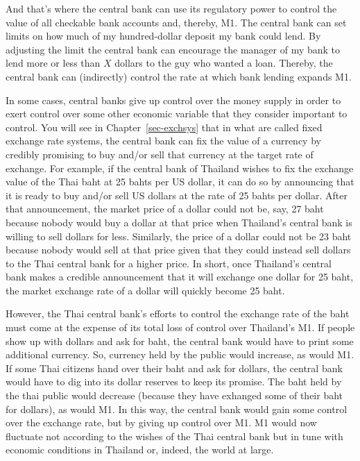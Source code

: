 \documentclass[
  letterpaper,
]{book}
\theoremstyle{plain}
\theoremstyle{remark}
\begin{document}
And that's where the central bank can use its regulatory power to
control the value of all checkable bank accounts and, thereby, M1. The
central bank can set limits on how much of my hundred-dollar deposit my
bank could lend. By adjusting the limit the central bank can encourage
the manager of my bank to lend more or less than \(X\) dollars to the
guy who wanted a loan. Thereby, the central bank can (indirectly)
control the rate at which bank lending expands M1.

In some cases, central banks give up control over the money supply in
order to exert control over some other economic variable that they
consider important to control. You will see in Chapter~\ref{sec-exchsys}
that in what are called fixed exchange rate systems, the central bank
can fix the value of a currency by credibly promising to buy and/or sell
that currency at the target rate of exchange. For example, if the
central bank of Thailand wishes to fix the exchange value of the Thai
baht at 25 bahts per US dollar, it can do so by announcing that it is
ready to buy and/or sell US dollars at the rate of 25 bahts per dollar.
After that announcement, the market price of a dollar could not be, say,
27 baht because nobody would buy a dollar at that price when Thailand's
central bank is willing to sell dollars for less. Similarly, the price
of a dollar could not be 23 baht because nobody would sell at that price
given that they could instead sell dollars to the Thai central bank for
a higher price. In short, once Thailand's central bank makes a credible
announcement that it will exchange one dollar for 25 baht, the market
exchange rate of a dollar will quickly become 25 baht.

However, the Thai central bank's efforts to control the exchange rate of
the baht must come at the expense of its total loss of control over
Thailand's M1. If people show up with dollars and ask for baht, the
central bank would have to print some additional currency. So, currency
held by the public would increase, as would M1. If some Thai citizens
hand over their baht and ask for dollars, the central bank would have to
dig into its dollar reserves to keep its promise. The baht held by the
thai public would decrease (because they have exhanged some of their
baht for dollars), as would M1. In this way, the central bank would gain
some control over the exchange rate, but by giving up control over M1.
M1 would now fluctuate not according to the wishes of the Thai central
bank but in tune with economic conditions in Thailand or, indeed, the
world at large.
\end{document}
